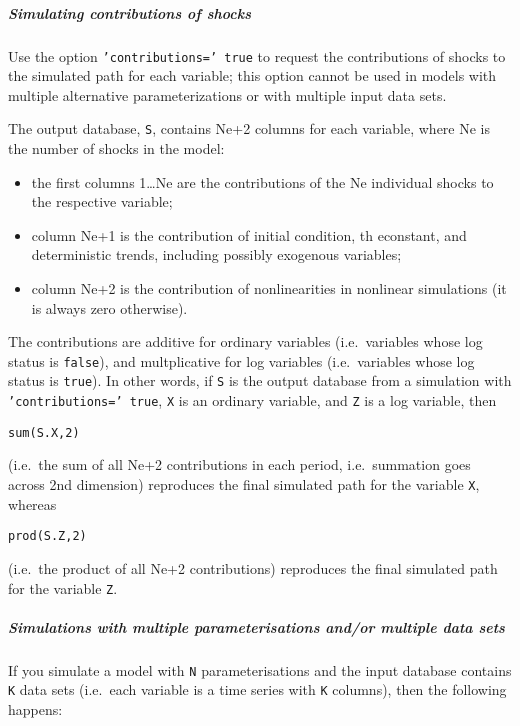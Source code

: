\subparagraph{Simulating contributions of
shocks}

Use the option \texttt{'contributions=' true} to request the
contributions of shocks to the simulated path for each variable; this
option cannot be used in models with multiple alternative
parameterizations or with multiple input data sets.

The output database, \texttt{S}, contains Ne+2 columns for each
variable, where Ne is the number of shocks in the model:

\begin{itemize}
\item
  the first columns 1\ldots{}Ne are the contributions of the Ne
  individual shocks to the respective variable;
\item
  column Ne+1 is the contribution of initial condition, th econstant,
  and deterministic trends, including possibly exogenous variables;
\item
  column Ne+2 is the contribution of nonlinearities in nonlinear
  simulations (it is always zero otherwise).
\end{itemize}

The contributions are additive for ordinary variables (i.e.~variables
whose log status is \texttt{false}), and multplicative for log variables
(i.e.~variables whose log status is \texttt{true}). In other words, if
\texttt{S} is the output database from a simulation with
\texttt{'contributions=' true}, \texttt{X} is an ordinary variable, and
\texttt{Z} is a log variable, then

\begin{verbatim}
sum(S.X,2)
\end{verbatim}

(i.e.~the sum of all Ne+2 contributions in each period, i.e.~summation
goes across 2nd dimension) reproduces the final simulated path for the
variable \texttt{X}, whereas

\begin{verbatim}
prod(S.Z,2)
\end{verbatim}

(i.e.~the product of all Ne+2 contributions) reproduces the final
simulated path for the variable \texttt{Z}.

\subparagraph{Simulations with multiple parameterisations and/or
multiple data
sets}

If you simulate a model with \texttt{N} parameterisations and the input
database contains \texttt{K} data sets (i.e.~each variable is a time
series with \texttt{K} columns), then the following happens:

